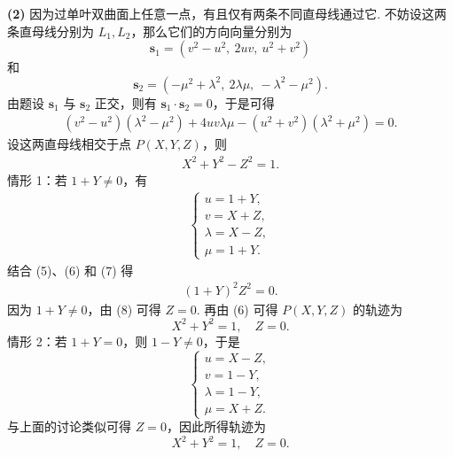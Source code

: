 \begin{solution}
\textbf{(2)} 因为过单叶双曲面上任意一点，有且仅有两条不同直母线通过它. 不妨设这两条直母线分别为 $L_1,L_2$，那么它们的方向向量分别为
\[
  \mathbf{s}_1=(v^2-u^2,\ 2uv,\ u^2+v^2)
\]
和
\[
  \mathbf{s}_2=(-\mu^2+\lambda^2,\ 2\lambda\mu,\ -\lambda^2-\mu^2).
\]
由题设 $\mathbf{s}_1$ 与 $\mathbf{s}_2$ 正交，则有 $\mathbf{s}_1\cdot\mathbf{s}_2=0$，于是可得
\begin{align*}
(v^2-u^2)(\lambda^2-\mu^2)+4uv\lambda\mu-(u^2+v^2)(\lambda^2+\mu^2)=0. \tag{5}
\end{align*}
设这两直母线相交于点 $P(X,Y,Z)$，则
\begin{align*}
X^2+Y^2-Z^2=1. \tag{6}
\end{align*}
情形 1：若 $1+Y\ne0$，有
\begin{align*}
\begin{cases}
  u=1+Y,\\
  v=X+Z,\\
  \lambda=X-Z,\\
  \mu=1+Y.
\end{cases} \tag{7}
\end{align*}
结合 (5)、(6) 和 (7) 得
\begin{align*}
(1+Y)^2Z^2=0. \tag{8}
\end{align*}
因为 $1+Y\ne0$，由 (8) 可得 $Z=0$. 再由 (6) 可得 $P(X,Y,Z)$ 的轨迹为
\[
  X^2+Y^2=1,\quad Z=0.
\]
情形 2：若 $1+Y=0$，则 $1-Y\ne0$，于是
\[
  \begin{cases}
    u=X-Z,\\
    v=1-Y,\\
    \lambda=1-Y,\\
    \mu=X+Z.
  \end{cases}
\]
与上面的讨论类似可得 $Z=0$，因此所得轨迹为
\[
  X^2+Y^2=1,\quad Z=0.
\]
\end{solution}

